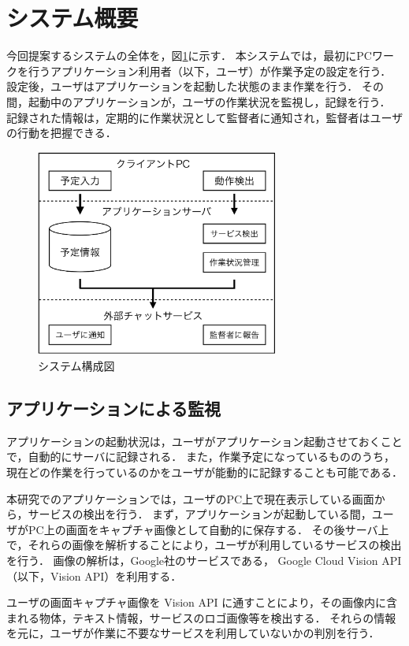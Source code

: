 \section{システム概要}
今回提案するシステムの全体を，図\ref{fig:structure_chart2}に示す．
本システムでは，最初にPCワークを行うアプリケーション利用者（以下，ユーザ）が作業予定の設定を行う．
設定後，ユーザはアプリケーションを起動した状態のまま作業を行う．
その間，起動中のアプリケーションが，ユーザの作業状況を監視し，記録を行う．
記録された情報は，定期的に作業状況として監督者に通知され，監督者はユーザの行動を把握できる．

\begin{figure}[h]
  \begin{center}
  \includegraphics[width=8.0cm]{../graphics/structure_chart2.png}
  \caption{システム構成図}
  \label{fig:structure_chart2}
  \end{center}
\end{figure}

\subsection{アプリケーションによる監視}
アプリケーションの起動状況は，ユーザがアプリケーション起動させておくことで，自動的にサーバに記録される．
また，作業予定になっているもののうち，現在どの作業を行っているのかをユーザが能動的に記録することも可能である．

本研究でのアプリケーションでは，ユーザのPC上で現在表示している画面から，サービスの検出を行う．
まず，アプリケーションが起動している間，ユーザがPC上の画面をキャプチャ画像として自動的に保存する．
その後サーバ上で，それらの画像を解析することにより，ユーザが利用しているサービスの検出を行う．
画像の解析は，Google社のサービスである， Google Cloud Vision API （以下，Vision API）を利用する\cite{visionAPI}．

ユーザの画面キャプチャ画像を Vision API に通すことにより，その画像内に含まれる物体，テキスト情報，サービスのロゴ画像等を検出する．
それらの情報を元に，ユーザが作業に不要なサービスを利用していないかの判別を行う．

